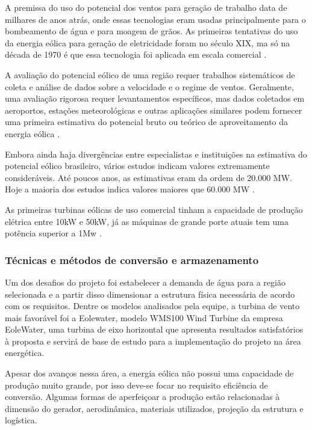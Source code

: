     A premissa do uso do potencial dos ventos para geração de trabalho data de milhares de anos atrás, onde essas tecnologias
    eram usadas principalmente para o bombeamento de água e para moagem de grãos. As primeiras tentativas do uso da energia
    eólica para geração de eletricidade foram no século XIX, ma só na década de 1970 é que essa tecnologia foi aplicada em
    escala comercial \cite{cmig}.
    
    A avaliação do potencial eólico de uma região requer trabalhos sistemáticos de coleta e análise de dados sobre a velocidade
    e o regime de ventos. Geralmente, uma avaliação rigorosa requer levantamentos específicos, mas dados coletados em 
    aeroportos, estações meteorológicas e outras aplicações similares podem fornecer uma primeira estimativa do potencial
    bruto ou teórico de aproveitamento da energia eólica \cite{amarante01}.
    
    Embora ainda haja divergências entre especialistas e instituições na estimativa do potencial eólico brasileiro, 
    vários estudos indicam valores extremamente consideráveis. Até poucos anos, as estimativas eram da ordem de 20.000 MW.
    Hoje a maioria dos estudos indica valores maiores que 60.000 MW \cite{amarante01}.
    
    As primeiras turbinas eólicas de uso comercial tinham a capacidade de produção elétrica entre 10kW e 50kW, já
    as máquinas de grande porte atuais tem uma potência superior a 1Mw \cite{dalexandria07}.
    
  \subsubsection{Técnicas e métodos de conversão e armazenamento}
    
    Um dos desafios do projeto foi estabelecer a demanda de água para a região selecionada e a partir disso dimensionar a
    estrutura física necessária de acordo com os requisitos. Dentre os modelos analisados pela equipe, a turbina de vento 
    mais favorável foi a Eolewater, modelo WMS100 Wind Turbine da empresa EoleWater, uma turbina de eixo horizontal que
    apresenta resultados satisfatórios à proposta e servirá de base de estudo para a implementação do projeto na área 
    energética.
    
    Apesar dos avanços nessa área, a energia eólica não possui uma capacidade de produção muito grande, por isso deve-se
    focar no requisito eficiência de conversão. Algumas formas de aperfeiçoar a produção estão relacionadas à dimensão do 
    gerador, aerodinâmica, materiais utilizados, projeção da estrutura e logística.
    
